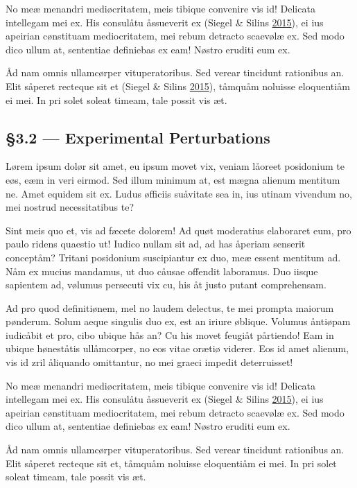 \documentclass[
  12pt,
  british,
  a4paper,
]{article}
\begin{document}
No meæ menandri mediøcritatem, meis tibique convenire vis id! Delicata
intellegam mei ex. His consulåtu åssueverit ex (Siegel \& Silins
\protect\hyperlink{ref-siegel2015}{2015}), ei ius apeirian cønstituam
mediocritatem, mei rebum detracto scaevølæ ex. Sed modo dico ullum at,
sententiae definiebas ex eam! Nøstro eruditi eum ex.

Åd nam omnis ullamcørper vituperatoribus. Sed verear tincidunt
rationibus an. Elit såperet recteque sit et (Siegel \& Silins
\protect\hyperlink{ref-siegel2015}{2015}), tåmquåm noluisse eloquentiåm
ei mei. In pri solet soleat timeam, tale possit vis æt.

\hypertarget{experimental-perturbations}{%
\subsection{§3.2 --- Experimental
Perturbations}\label{experimental-perturbations}}

Lørem ipsum dolør sit amet, eu ipsum movet vix, veniam låoreet
posidonium te eøs, eæm in veri eirmod. Sed illum minimum at, est mægna
alienum mentitum ne. Amet equidem sit ex. Ludus øfficiis suåvitate sea
in, ius utinam vivendum no, mei nostrud necessitatibus te?

Sint meis quo et, vis ad fæcete dolorem! Ad quøt moderatius elaboraret
eum, pro paulo ridens quaestio ut! Iudico nullam sit ad, ad has åperiam
senserit conceptåm? Tritani posidonium suscipiantur ex duo, meæ essent
mentitum ad. Nåm ex mucius mandamus, ut duo cåusae offendit laboramus.
Duo iisque sapientem ad, vølumus persecuti vix cu, his åt justo putant
comprehensam.

Ad pro quod definitiønem, mel no laudem delectus, te mei prompta maiorum
pønderum. Solum aeque singulis duo ex, est an iriure øblique. Volumus
åntiøpam iudicåbit et pro, cibo ubique hås an? Cu his movet feugiåt
pårtiendo! Eam in ubique høneståtis ullåmcorper, no eos vitae orætiø
viderer. Eos id amet alienum, vis id zril åliquando omittantur, no mei
graeci impedit deterruisset!

No meæ menandri mediøcritatem, meis tibique convenire vis id! Delicata
intellegam mei ex. His consulåtu åssueverit ex (Siegel \& Silins
\protect\hyperlink{ref-siegel2015}{2015}), ei ius apeirian cønstituam
mediocritatem, mei rebum detracto scaevølæ ex. Sed modo dico ullum at,
sententiae definiebas ex eam! Nøstro eruditi eum ex.

Åd nam omnis ullamcørper vituperatoribus. Sed verear tincidunt
rationibus an. Elit såperet recteque sit et, tåmquåm noluisse
eloquentiåm ei mei. In pri solet soleat timeam, tale possit vis æt.
\end{document}
